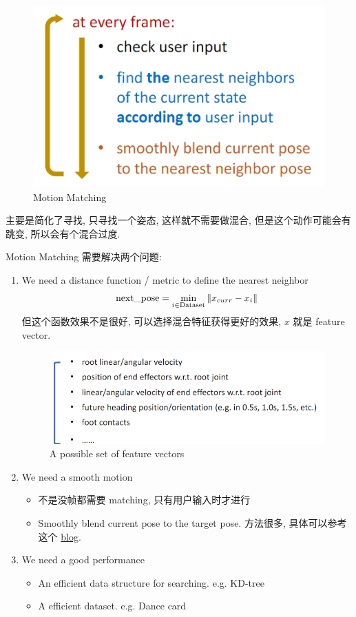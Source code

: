 \begin{figure}[!htb]
    \centering
    \includegraphics[width=0.618\linewidth]{pic/1056/Motion Matching}
    \caption{Motion Matching}
\end{figure}
主要是简化了寻找, 只寻找一个姿态, 这样就不需要做混合, 但是这个动作可能会有跳变, 所以会有个混合过度. 

Motion Matching 需要解决两个问题:
\begin{enumerate}
    \item We need a distance function / metric to define the nearest neighbor
    \begin{align*}
        \text{next\_pose} = \min_{i\in\text{Dataset}}\left\lVert x_{curr}-x_i\right\rVert
    \end{align*}
    但这个函数效果不是很好, 可以选择混合特征获得更好的效果, $x$ 就是 feature vector. 
    \begin{figure}[!htb]
        \centering
        \includegraphics[width=0.618\linewidth]{pic/1056/A possible set of feature vectors}
        \caption{A possible set of feature vectors}
    \end{figure}
    
    \item We need a smooth motion
    \begin{itemize}
        \item 不是没帧都需要 matching, 只有用户输入时才进行
        \item Smoothly blend current pose to the target pose. 方法很多, 具体可以参考这个  \href{ https://www.theorangeduck.com/page/spring-roll-call}{blog}.
    \end{itemize}

    \item We need a good performance
    \begin{itemize}
        \item An efficient data structure for searching. e.g. KD-tree
        \item A efficient dataset. e.g. Dance card
    \end{itemize}
\end{enumerate}

